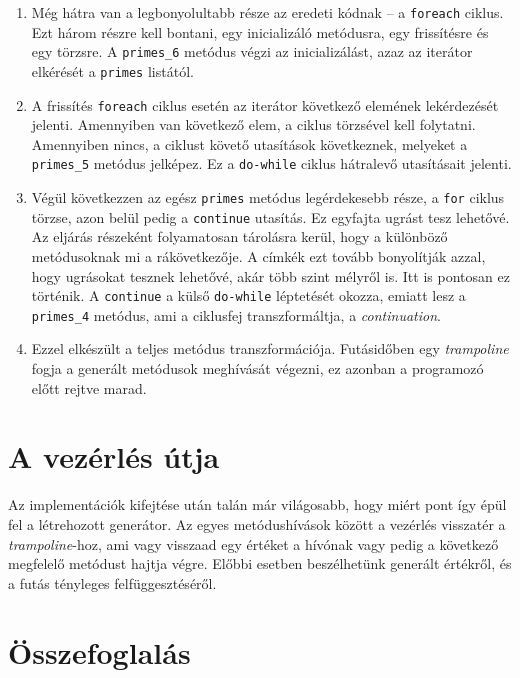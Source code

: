 \documentclass[12pt, a4paper]{article}
\begin{document}
\begin{enumerate}
    \item
    Még hátra van a legbonyolultabb része az eredeti kódnak -- a \texttt{foreach} ciklus. Ezt három részre kell bontani, egy inicializáló metódusra, egy frissítésre és egy törzsre. A \texttt{primes\_6} metódus végzi az inicializálást, azaz az iterátor elkérését a \texttt{primes} listától.
    \item
    A frissítés \texttt{foreach} ciklus esetén az iterátor következő elemének lekérdezését jelenti. Amennyiben van következő elem, a ciklus törzsével kell folytatni. Amennyiben nincs, a ciklust követő utasítások következnek, melyeket a \texttt{primes\_5} metódus jelképez. Ez a \texttt{do-while} ciklus hátralevő utasításait jelenti.
    \item
    Végül következzen az egész \texttt{primes} metódus legérdekesebb része, a \texttt{for} ciklus törzse, azon belül pedig a \texttt{continue} utasítás. Ez egyfajta ugrást tesz lehetővé. Az eljárás részeként folyamatosan tárolásra kerül, hogy a különböző metódusoknak mi a rákövetkezője. A címkék ezt tovább bonyolítják azzal, hogy ugrásokat tesznek lehetővé, akár több szint mélyről is. Itt is pontosan ez történik. A \texttt{continue} a külső \texttt{do-while} léptetését okozza, emiatt lesz a \texttt{primes\_4} metódus, ami a ciklusfej transzformáltja, a \textit{continuation}.
    \item
    Ezzel elkészült a teljes metódus transzformációja. Futásidőben egy \textit{trampoline} fogja a generált metódusok meghívását végezni, ez azonban a programozó előtt rejtve marad.
\end{enumerate}

\section{A vezérlés útja}

Az implementációk kifejtése után talán már világosabb, hogy miért pont így épül fel a létrehozott generátor. Az egyes metódushívások között a vezérlés visszatér a \textit{trampoline}-hoz, ami vagy visszaad egy értéket a hívónak vagy pedig a következő megfelelő metódust hajtja végre. Előbbi esetben beszélhetünk generált értékről, és a futás tényleges felfüggesztéséről.

\section{Összefoglalás}
\end{document}
